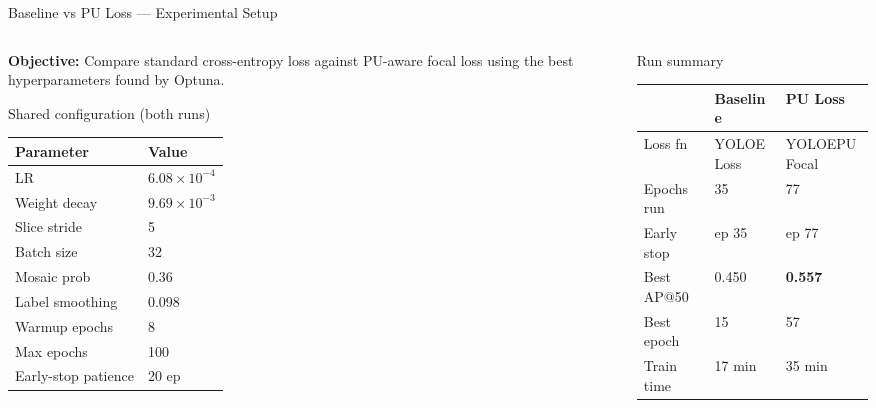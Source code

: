 \documentclass[aspectratio=169, 10pt]{beamer}
\begin{document}
\begin{frame}{Baseline vs PU Loss — Experimental Setup}
  \begin{columns}[T]
    \begin{column}{0.50\textwidth}
      \textbf{Objective:} Compare standard cross-entropy loss against PU-aware focal loss using the best hyperparameters found by Optuna.

      \vspace{6pt}
      \begin{block}{\small Shared configuration (both runs)}
        \small
        \begin{tabular}{ll}
          \toprule
          Parameter & Value \\
          \midrule
          LR & $6.08 \times 10^{-4}$ \\
          Weight decay & $9.69 \times 10^{-3}$ \\
          Slice stride & 5 \\
          Batch size & 32 \\
          Mosaic prob & 0.36 \\
          Label smoothing & 0.098 \\
          Warmup epochs & 8 \\
          Max epochs & 100 \\
          Early-stop patience & 20 ep \\
          \bottomrule
        \end{tabular}
      \end{block}
    \end{column}
    \begin{column}{0.46\textwidth}
      \vspace{2pt}
      \begin{block}{\small Run summary}
        \small
        \begin{tabular}{lll}
          \toprule
          & \textbf{Baseline} & \textbf{PU Loss} \\
          \midrule
          Loss fn      & YOLOELoss & YOLOEPUFocal \\
          Epochs run   & 35        & 77 \\
          Early stop   & ep 35     & ep 77 \\
          \rowcolor{rowhl}
          Best AP@50   & 0.450     & \textbf{0.557} \\
          Best epoch   & 15        & 57 \\
          Train time   & 17 min    & 35 min \\
          \bottomrule
        \end{tabular}
      \end{block}


\end{column}
\end{columns}
\end{frame}
\end{document}
